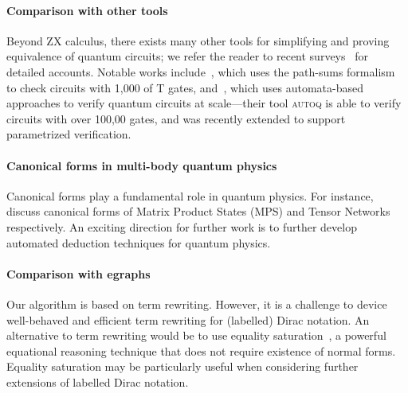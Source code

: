 \paragraph*{Comparison with other tools}
Beyond ZX calculus, there exists many other tools for simplifying and
proving equivalence of quantum circuits; we refer the reader to recent
surveys~\cite{QPV-survey2021,CharetonLVVBX23} for detailed accounts.
Notable works include~\cite{amy2018towards}, which uses the path-sums
formalism to check circuits with 1,000 of T gates,
and~\cite{AutoQ_pldi_2023,AutoQ2023,AutoQ_popl2025}, which uses
automata-based approaches to verify quantum circuits at scale---their
tool \textsc{autoq} is able to verify circuits with over 100,00 gates,
and was recently extended to support parametrized verification.


\paragraph*{Canonical forms in multi-body quantum physics}
Canonical forms play a fundamental role in quantum physics. For
instance, \cite{perezgarcia2007,RevModPhys.93.045003,Acuaviva_2023}
discuss canonical forms of Matrix Product States (MPS) and Tensor
Networks respectively. An exciting direction for further work is to
further develop automated deduction techniques for quantum physics.

\paragraph*{Comparison with egraphs}
Our algorithm is based on term rewriting. However, it is a challenge
to device well-behaved and efficient term rewriting for (labelled)
Dirac notation. An alternative to term rewriting would be to use
equality saturation~\cite{DBLP:journals/pacmpl/WillseyNWFTP21}, a
powerful equational reasoning technique that does not require
existence of normal forms. Equality saturation may be particularly
useful when considering further extensions of labelled Dirac notation.


